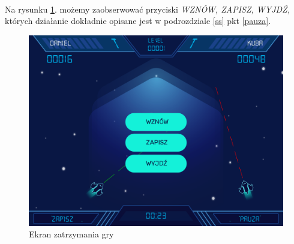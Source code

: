 \documentclass[a4paper]{article}
\begin{document}
\paragraph{}Na rysunku \ref{fig:pauza}. możemy zaobserwować przyciski \textit{WZNÓW, ZAPISZ, WYJDŹ,} których działanie dokładnie opisane jest w podrozdziale \ref{ss} pkt \ref{pauza}.
\begin{figure}[H]
    \centering
    \includegraphics[width=1\textwidth]{img/ekran-pauza.png}
    \caption{Ekran zatrzymania gry}
    \label{fig:pauza}
\end{figure}

\newpage
\end{document}
